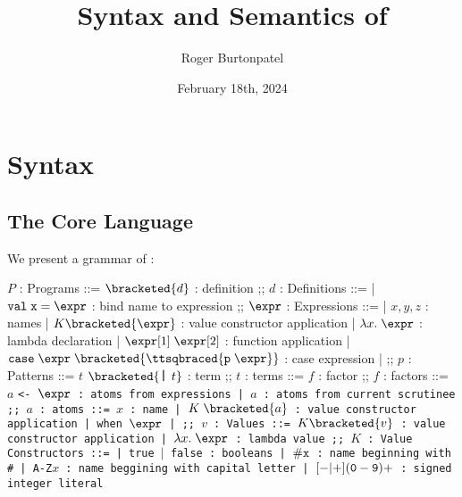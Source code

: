 \documentclass[]{article}
\title{Syntax and Semantics of \PPlus}
\author{Roger Burtonpatel}
\date{February 18th, 2024}
\begin{document}
\maketitle

\section{Syntax}

\subsection{The Core Language}

We present a grammar of \PPlus: 

\bigskip

\begin{center}
    \begin{bnf}
    $P$ : \textsf{Programs} ::=
    $\bracketed{d}$ : definition
    ;;
    $d$ : \textsf{Definitions} ::=
    | $\tt{val} \; x \; \tt{=} \; \expr$ : bind name to expression
    ;;
    $\expr$ : Expressions ::= 
    | $x, y, z$ : names
    | $K\bracketed{\expr}$ : value constructor application 
    | $\lambda x. \; \expr$ : lambda declaration  
    | $\expr[1] \; \expr[2]$ : function application 
    | $\tt{case} \; \expr \; \bracketed{\ttsqbraced{p \; \expr}}$ : case expression 
    | \ttbraced{$\expr$}
    ;;
    $p$ : \textsf{Patterns} ::= $t$ $\bracketed{\text{\large\texttt{\char`\|}}\mskip6mu t}$ : term
    ;;
    $t$ : terms ::= $f$  : factor
    ;;
    $f$ : factors ::= $a$ \tt{<-} $\expr$ : atoms from expressions 
        | $a$ : atoms from current scrutinee
    ;;
    $a$ : atoms ::= $x$ : name 
    | $K \; \bracketed{a}$ : value constructor application 
    | \tt{when} $\expr$
    | 
    ;;
    $v$ : Values ::= $K\bracketed{v}$ : value constructor application 
    | $\lambda x. \; \expr$ : lambda value 
    ;;
    $K$ : \textsf{Value Constructors} ::=
    | \tt{true} $\vert$ \tt{false} : booleans
    | $\tt{\#}x$ : name beginning with \tt{\#}
    | \tt{A-Z}$x$ : name beggining with capital letter
    | $[\tt{-}\vert\tt{+}](\tt{0}-\tt{9})+$ : signed integer literal 
    \end{bnf}
\end{center}
\end{document}

